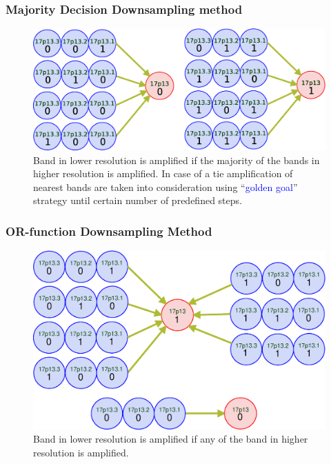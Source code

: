 \documentclass[dvips]{beamer}
\begin{document}
\begin{frame}
\frametitle{Majority Decision Downsampling method}
\begin{figure}
\includegraphics[scale=0.3]{figures/mdmapping}
\caption{Band in lower resolution is amplified if the majority of the bands in higher resolution is amplified. In case of a tie amplification of nearest bands are taken into consideration using ``\textcolor{blue}{golden goal}'' strategy until certain number of predefined steps.}
\end{figure}
\end{frame}

\begin{frame}
\frametitle{OR-function Downsampling Method}
\begin{figure}
\includegraphics[scale=0.3]{figures/ptmapping}
\caption{Band in lower resolution is amplified if any of the band in higher resolution is amplified.}
\end{figure}
\end{frame}
\end{document}
